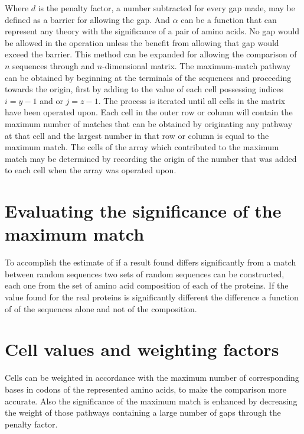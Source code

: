 Where $d$ is the penalty factor, a number subtracted for every gap made, may be defined as a barrier for allowing the gap.
And $\alpha$ can be a function that can represent any theory with the significance of a pair of amino acids.
No gap would be allowed in the operation unless the benefit from allowing that gap would exceed the barrier.
This method can be expanded for allowing the comparison of $n$ sequences through and $n$-dimensional matrix.
The maximum-match pathway can be obtained by beginning at the terminals of the sequences and proceeding towards the origin, first by adding to the value of each cell possessing indices $i=y-1$ and or $j = z-1$.
The process is iterated until all cells in the matrix have been operated upon.
Each cell in the outer row or column will contain the maximum number of matches that can be obtained by originating any pathway at that cell and the largest number in that row or column is equal to the maximum match.
The cells of the array which contributed to the maximum match may be determined by recording the origin of the number that was added to each cell when the array was operated upon.

\section{Evaluating the significance of the maximum match}
To accomplish the estimate of if a result found differs significantly from a match between random sequences two sets of random sequences can be constructed, each one from the set of amino acid composition of each of the proteins.
If the value found for the real proteins is significantly different the difference a function of of the sequences alone and not of the composition.

\section{Cell values and weighting factors}
Cells can be weighted in accordance with the maximum number of corresponding bases in codons of the represented amino acids, to make the comparison more accurate.
Also the significance of the maximum match is enhanced by decreasing the weight of those pathways containing a large number of gaps through the penalty factor.
